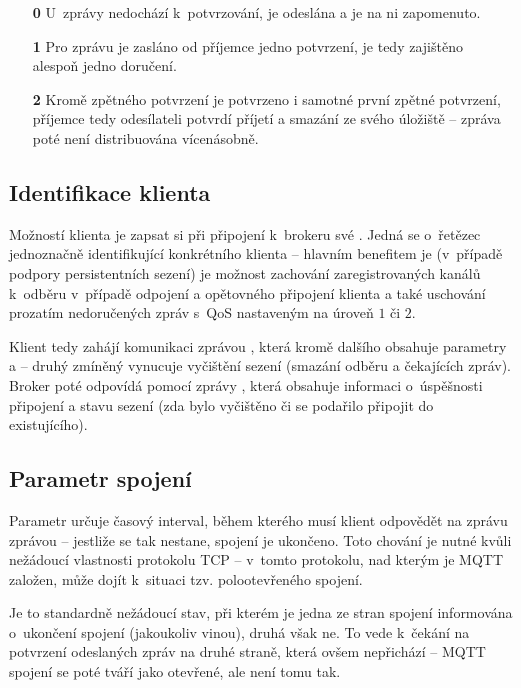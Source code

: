 \begin{enumerate}
    \item[\textbf{0}] U~zprávy nedochází k~potvrzování, je odeslána a je na ni zapomenuto.
    \item[\textbf{1}] Pro zprávu je zasláno od příjemce jedno potvrzení, je tedy zajištěno alespoň jedno doručení.
    \item[\textbf{2}] Kromě zpětného potvrzení je potvrzeno i samotné první zpětné potvrzení, příjemce tedy
    odesílateli potvrdí příjetí a smazání ze svého úložiště -- zpráva poté není distribuována vícenásobně.
\end{enumerate}

\subsection{Identifikace klienta }\label{subsec:identifikace-klienta-client-id}
Možností klienta je zapsat si při připojení k~brokeru své .
Jedná se o~řetězec jednoznačně identifikující konkrétního klienta -- hlavním benefitem je (v~případě podpory
persistentních sezení) je možnost zachování zaregistrovaných kanálů k~odběru v~případě odpojení a
opětovného připojení klienta a také uschování prozatím nedoručených zpráv s~QoS nastaveným na úroveň $1$ či $2$.

Klient tedy zahájí komunikaci zprávou , která kromě dalšího obsahuje parametry  a  -- druhý zmíněný vynucuje vyčištění sezení (smazání odběru a čekajících zpráv).
Broker poté odpovídá pomocí zprávy , která obsahuje informaci o~úspěšnosti připojení a stavu sezení (zda
bylo vyčištěno či se podařilo připojit do existujícího).

\subsection{Parametr spojení }\label{subsec:parametr-spojeni-keep-alive}
Parametr  určuje časový interval, během kterého musí klient odpovědět na zprávu  zprávou
 -- jestliže se tak nestane, spojení je ukončeno.
Toto chování je nutné kvůli nežádoucí vlastnosti protokolu TCP --
v~tomto protokolu, nad kterým je MQTT založen, může dojít k~situaci tzv. polootevřeného spojení.

Je to standardně nežádoucí stav, při kterém je jedna ze stran spojení informována o~ukončení spojení (jakoukoliv
vinou), druhá však ne.
To vede k~čekání na potvrzení odeslaných zpráv na druhé straně, která ovšem nepřichází -- MQTT spojení se poté
tváří jako otevřené, ale není tomu tak.

